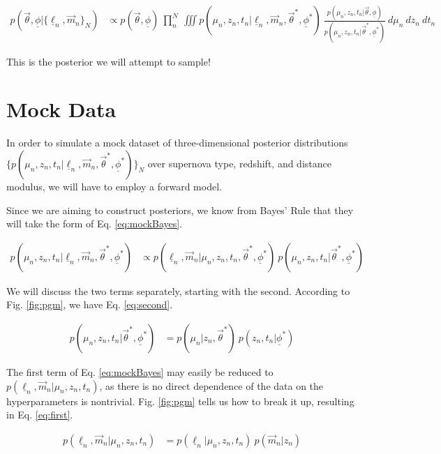 \documentclass[12pt, onecolumn]{emulateapj}
\newcommand{\textul}{\underline}
\begin{document}
\begin{align}
p(\vec{\theta}, \textul{\phi} | \{\textul{\ell}_{n}, \vec{m}_{n}\}_{N}) &\propto p(\vec{\theta}, \textul{\phi})\ \prod_{n}^{N}\ \iiint p(\mu_{n}, z_{n}, t_{n} | \textul{\ell}_{n}, \vec{m}_{n}, \vec{\theta}^{*}, \textul{\phi}^{*})\ \frac{p(\mu_{n}, z_{n}, t_{n} | \vec{\theta}, \textul{\phi})}{p(\mu_{n}, z_{n}, t_{n} | \vec{\theta}^{*}, \textul{\phi}^{*})}\ d\mu_{n}\ dz_{n}\ dt_{n}
\end{align}

This is the posterior we will attempt to sample!

\section{Mock Data}
\label{sec:data}

In order to simulate a mock dataset of three-dimensional posterior distributions $\{p(\mu_{n}, z_{n}, t_{n} | \textul{\ell}_{n}, \vec{m}_{n}, \vec{\theta}^{*}, \textul{\phi}^{*})\}_{N}$ over supernova type, redshift, and distance modulus, we will have to employ a forward model.

Since we are aiming to construct posteriors, we know from Bayes' Rule that they will take the form of Eq. \ref{eq:mockBayes}.

\begin{align}
\label{eq:mockBayes}
p(\mu_{n}, z_{n}, t_{n} | \textul{\ell}_{n}, \vec{m}_{n}, \vec{\theta}^{*}, \textul{\phi}^{*}) &\propto p(\textul{\ell}_{n}, \vec{m}_{n} | \mu_{n}, z_{n}, t_{n}, \vec{\theta}^{*}, \textul{\phi}^{*})\ p(\mu_{n}, z_{n}, t_{n} | \vec{\theta}^{*}, \textul{\phi}^{*})
\end{align}

We will discuss the two terms separately, starting with the second.  According to Fig. \ref{fig:pgm}, we have Eq. \ref{eq:second}.

\begin{align}
\label{eq:second}
p(\mu_{n}, z_{n}, t_{n} | \vec{\theta}^{*}, \textul{\phi}^{*}) &= p(\mu_{n} | z_{n}, \vec{\theta}^{*})\ p(z_{n}, t_{n} | \textul{\phi}^{*})
\end{align}

The first term of Eq. \ref{eq:mockBayes} may easily be reduced to $p(\textul{\ell}_{n}, \vec{m}_{n} | \mu_{n}, z_{n}, t_{n})$, as there is no direct dependence of the data on the hyperparameters is nontrivial.  Fig. \ref{fig:pgm} tells us how to break it up, resulting in Eq. \ref{eq:first}.

\begin{align}
\label{eq:first}
p(\textul{\ell}_{n}, \vec{m}_{n} | \mu_{n}, z_{n}, t_{n}) &= p(\textul{\ell}_{n} | \mu_{n}, z_{n}, t_{n})\ p(\vec{m}_{n} | z_{n})
\end{align}
\end{document}
